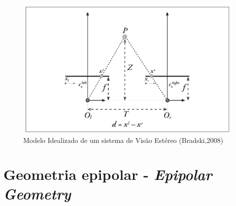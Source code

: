 \begin{figure}[H]
 	\centering
 	\includegraphics[scale=0.35]{./Resources/stereo_image_geometric_model.png}
 	\caption{Modelo Idealizado de um sistema de Visão Estéreo (Bradski,2008)}
 	\label{stereo_image_geometric_model}
\end{figure}


\section{Geometria epipolar - \textit{Epipolar Geometry}}







